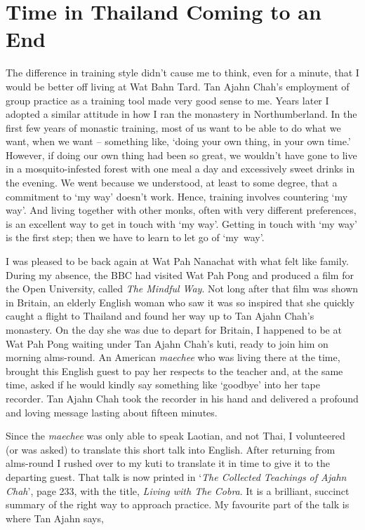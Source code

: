 \chapter{Time in Thailand Coming to an End}

The difference in training style didn't cause me to think, even for a
minute, that I would be better off living at Wat Bahn Tard. Tan Ajahn
Chah's employment of group practice as a training tool made very good
sense to me. Years later I adopted a similar attitude in how I ran the
monastery in Northumberland. In the first few years of monastic
training, most of us want to be able to do what we want, when we want --
something like, `doing your own thing, in your own time.' However, if
doing our own thing had been so great, we wouldn't have gone to live in
a mosquito-infested forest with one meal a day and excessively sweet
drinks in the evening. We went because we understood, at least to some
degree, that a commitment to `my way' doesn't work. Hence, training
involves countering `my way'. And living together with other monks,
often with very different preferences, is an excellent way to get in
touch with `my way'. Getting in touch with `my way' is the first step;
then we have to learn to let go of `my~way'.

I was pleased to be back again at Wat Pah Nanachat with what felt like
family. During my absence, the BBC had visited Wat Pah Pong and produced
a film for the Open University, called \emph{The Mindful Way}. Not long
after that film was shown in Britain, an elderly English woman who saw
it was so inspired that she quickly caught a flight to Thailand and
found her way up to Tan Ajahn Chah's monastery. On the day she was due
to depart for Britain, I happened to be at Wat Pah Pong waiting under
Tan Ajahn Chah's kuti, ready to join him on morning alms-round. An
American \emph{maechee} who was living there at the time, brought this
English guest to pay her respects to the teacher and, at the same time,
asked if he would kindly say something like `goodbye' into her tape
recorder. Tan Ajahn Chah took the recorder in his hand and delivered a
profound and loving message lasting about fifteen minutes.

Since the \emph{maechee} was only able to speak Laotian, and not Thai, I
volunteered (or was asked) to translate this short talk into English.
After returning from alms-round I rushed over to my kuti to translate it
in time to give it to the departing guest. That talk is now printed in
`\emph{The Collected Teachings of Ajahn Chah}\cite{collected}',
page 233, with the title,
\emph{Living with The Cobra}. It is a brilliant, succinct summary of the
right way to approach practice. My favourite part of the talk is where
Tan Ajahn says,

